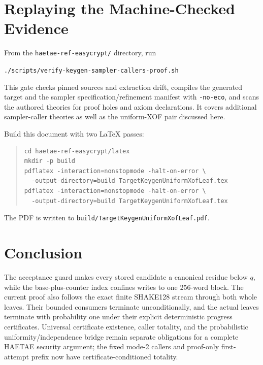 \documentclass[11pt]{article}
\theoremstyle{definition}
\theoremstyle{plain}
\theoremstyle{remark}
\newcommand{\code}[1]{\nolinkurl{#1}}
\begin{document}
\section{Replaying the Machine-Checked Evidence}

From the \code{haetae-ref-easycrypt/} directory, run
\begin{center}
\code{./scripts/verify-keygen-sampler-callers-proof.sh}
\end{center}
This gate checks pinned sources and extraction drift, compiles the generated
target and the sampler specification/refinement manifest with
\code{-no-eco}, and scans the authored theories for proof holes and axiom
declarations.  It covers additional sampler-caller theories as well as the
uniform-XOF pair discussed here.

Build this document with two \LaTeX{} passes:
\begin{quote}
\begin{verbatim}
cd haetae-ref-easycrypt/latex
mkdir -p build
pdflatex -interaction=nonstopmode -halt-on-error \
  -output-directory=build TargetKeygenUniformXofLeaf.tex
pdflatex -interaction=nonstopmode -halt-on-error \
  -output-directory=build TargetKeygenUniformXofLeaf.tex
\end{verbatim}
\end{quote}
The PDF is written to
\code{build/TargetKeygenUniformXofLeaf.pdf}.

\section*{Conclusion}

The acceptance guard makes every stored candidate a canonical residue below
$q$, while the base-plus-counter index confines writes to one 256-word block.
The current proof also follows the exact finite SHAKE128 stream through both
whole leaves.  Their bounded consumers terminate unconditionally, and the
actual leaves terminate with probability one under their explicit deterministic
progress certificates.  Universal certificate existence, caller totality, and
the probabilistic uniformity/independence bridge remain separate obligations
for a complete HAETAE security argument; the fixed mode-2 callers and
proof-only first-attempt prefix now have certificate-conditioned totality.
\end{document}
